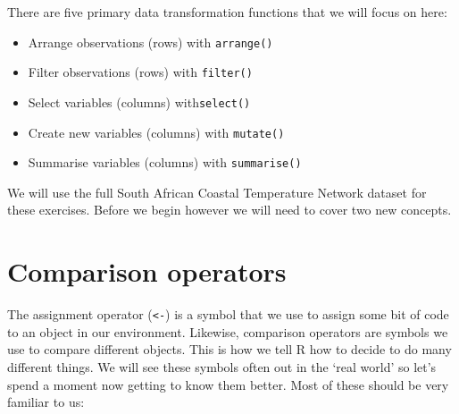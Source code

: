 \documentclass[]{book}
\newenvironment{Shaded}{\begin{snugshade}}{\end{snugshade}}
\newcommand{\KeywordTok}[1]{\textcolor[rgb]{0.13,0.29,0.53}{\textbf{#1}}}
\newcommand{\DataTypeTok}[1]{\textcolor[rgb]{0.13,0.29,0.53}{#1}}
\newcommand{\DecValTok}[1]{\textcolor[rgb]{0.00,0.00,0.81}{#1}}
\newcommand{\StringTok}[1]{\textcolor[rgb]{0.31,0.60,0.02}{#1}}
\newcommand{\CommentTok}[1]{\textcolor[rgb]{0.56,0.35,0.01}{\textit{#1}}}
\newcommand{\OperatorTok}[1]{\textcolor[rgb]{0.81,0.36,0.00}{\textbf{#1}}}
\newcommand{\NormalTok}[1]{#1}
\providecommand{\tightlist}{%
  \setlength{\itemsep}{0pt}\setlength{\parskip}{0pt}}
\theoremstyle{definition}
\theoremstyle{definition}
\theoremstyle{definition}
\theoremstyle{remark}
\begin{document}
There are five primary data transformation functions that we will focus
on here:

\begin{itemize}
\tightlist
\item
  Arrange observations (rows) with \texttt{arrange()}\\
\item
  Filter observations (rows) with \texttt{filter()}\\
\item
  Select variables (columns) with\texttt{select()}\\
\item
  Create new variables (columns) with \texttt{mutate()}\\
\item
  Summarise variables (columns) with \texttt{summarise()}
\end{itemize}

We will use the full South African Coastal Temperature Network dataset
for these exercises. Before we begin however we will need to cover two
new concepts.

\begin{Shaded}
\end{Shaded}

\section{Comparison operators}\label{comparison-operators}

The assignment operator (\texttt{\textless{}-}) is a symbol that we use
to assign some bit of code to an object in our environment. Likewise,
comparison operators are symbols we use to compare different objects.
This is how we tell R how to decide to do many different things. We will
see these symbols often out in the `real world' so let's spend a moment
now getting to know them better. Most of these should be very familiar
to us:
\end{document}
